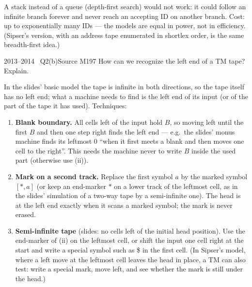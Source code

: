 \documentclass[11pt,a4paper]{article}
\begin{document}
\begin{solution}
A stack instead of a queue (depth-first search) would not work: it could follow an infinite branch forever and never reach an accepting ID on another branch. Cost: up to exponentially many IDs --- the models are equal in power, not in efficiency. (Sipser's version, with an address tape enumerated in shortlex order, is the same breadth-first idea.)
\end{solution}

\begin{question}{2013--2014 \textbullet\ Q2(b)}{Source M19}{7}
How can we recognize the left end of a TM tape? Explain.
\end{question}
\begin{solution}
In the slides' basic model the tape is infinite in both directions, so the tape itself has no left end; what a machine needs to find is the left end of its input (or of the part of the tape it has used). Techniques:
\begin{enumerate}
\item \textbf{Blank boundary.} All cells left of the input hold $B$, so moving left until the first $B$ and then one step right finds the left end --- e.g.\ the slides' monus machine finds its leftmost 0 ``when it first meets a blank and then moves one cell to the right''. This needs the machine never to write $B$ inside the used part (otherwise use (ii)).
\item \textbf{Mark on a second track.} Replace the first symbol $a$ by the marked symbol $[\ast,a]$ (or keep an end-marker $\ast$ on a lower track of the leftmost cell, as in the slides' simulation of a two-way tape by a semi-infinite one). The head is at the left end exactly when it scans a marked symbol; the mark is never erased.
\item \textbf{Semi-infinite tape} (slides: no cells left of the initial head position). Use the end-marker of (ii) on the leftmost cell, or shift the input one cell right at the start and write a special symbol such as \$ in the first cell. (In Sipser's model, where a left move at the leftmost cell leaves the head in place, a TM can also test: write a special mark, move left, and see whether the mark is still under the head.)
\end{enumerate}
\end{solution}
\end{document}
